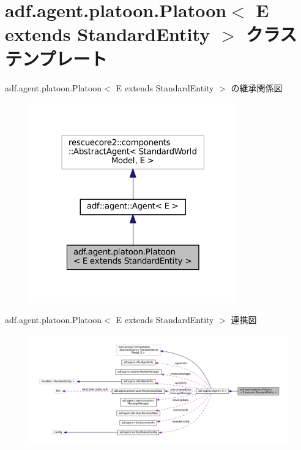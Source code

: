 \hypertarget{classadf_1_1agent_1_1platoon_1_1Platoon}{}\section{adf.\+agent.\+platoon.\+Platoon$<$ E extends Standard\+Entity $>$ クラステンプレート}
\label{classadf_1_1agent_1_1platoon_1_1Platoon}


adf.\+agent.\+platoon.\+Platoon$<$ E extends Standard\+Entity $>$ の継承関係図
\nopagebreak
\begin{figure}[H]
\begin{center}
\leavevmode
\includegraphics[width=254pt]{classadf_1_1agent_1_1platoon_1_1Platoon__inherit__graph}
\end{center}
\end{figure}


adf.\+agent.\+platoon.\+Platoon$<$ E extends Standard\+Entity $>$ 連携図
\nopagebreak
\begin{figure}[H]
\begin{center}
\leavevmode
\includegraphics[width=350pt]{classadf_1_1agent_1_1platoon_1_1Platoon__coll__graph}
\end{center}
\end{figure}
